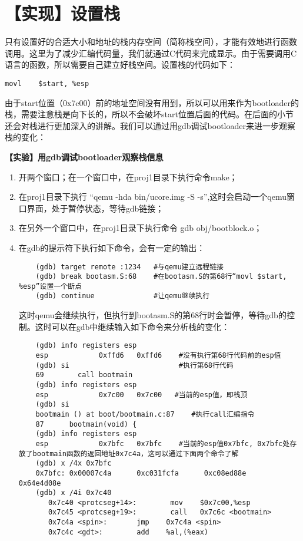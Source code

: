 \section{【实现】设置栈}\label{ux5b9eux73b0ux8bbeux7f6eux6808}

只有设置好的合适大小和地址的栈内存空间（简称栈空间），才能有效地进行函数调用。这里为了减少汇编代码量，我们就通过C代码来完成显示。由于需要调用C语言的函数，所以需要自己建立好栈空间。设置栈的代码如下：

\begin{lstlisting}
movl    $start, %esp
\end{lstlisting}

由于start位置（0x7c00）前的地址空间没有用到，所以可以用来作为bootloader的栈，需要注意栈是向下长的，所以不会破坏start位置后面的代码。在后面的小节还会对栈进行更加深入的讲解。我们可以通过用gdb调试bootloader来进一步观察栈的变化：

\textbf{【实验】用gdb调试bootloader观察栈信息 }

\begin{enumerate}
\def\labelenumi{\arabic{enumi}.}
\item
  开两个窗口；在一个窗口中，在proj1目录下执行命令make；
\item
  在proj1目录下执行 ``qemu -hda bin/ucore.img -S
  -s'',这时会启动一个qemu窗口界面，处于暂停状态，等待gdb链接；
\item
  在另外一个窗口中，在proj1目录下执行命令 gdb obj/bootblock.o；
\item
  在gdb的提示符下执行如下命令，会有一定的输出：

\begin{lstlisting}
    (gdb) target remote :1234   #与qemu建立远程链接
    (gdb) break bootasm.S:68    #在bootasm.S的第68行“movl $start, %esp”设置一个断点
    (gdb) continue              #让qemu继续执行  
\end{lstlisting}

  这时qemu会继续执行，但执行到bootasm.S的第68行时会暂停，等待gdb的控制。这时可以在gdb中继续输入如下命令来分析栈的变化：

\begin{lstlisting}
    (gdb) info registers esp
    esp            0xffd6   0xffd6    #没有执行第68行代码前的esp值
    (gdb) si                          #执行第68行代码
    69        call bootmain
    (gdb) info registers esp
    esp            0x7c00   0x7c00   #当前的esp值，即栈顶
    (gdb) si
    bootmain () at boot/bootmain.c:87    #执行call汇编指令
    87      bootmain(void) {
    (gdb) info registers esp
    esp            0x7bfc   0x7bfc    #当前的esp值0x7bfc, 0x7bfc处存放了bootmain函数的返回地址0x7c4a，这可以通过下面两个命令了解  
    (gdb) x /4x 0x7bfc                  
    0x7bfc: 0x00007c4a      0xc031fcfa      0xc08ed88e      0x64e4d08e
    (gdb) x /4i 0x7c40
       0x7c40 <protcseg+14>:        mov    $0x7c00,%esp
       0x7c45 <protcseg+19>:        call   0x7c6c <bootmain>
       0x7c4a <spin>:       jmp    0x7c4a <spin>
       0x7c4c <gdt>:        add    %al,(%eax)
\end{lstlisting}
\end{enumerate}

